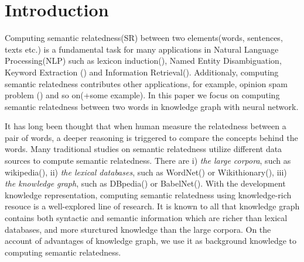\section{Introduction}
Computing semantic relatedness(SR) between two elements(words, sentences,
texts etc.) is a fundamental task for many applications in Natural Language
Processing(NLP) such as lexicon induction(\cite{aaai/QadirMGL15}), Named 
Entity Disambiguation{\cite{acl/HanZ10}}, Keyword Extraction
(\cite{ijcai/ZhangFW13}) and Information Retrieval(\cite{acl/GurevychMZ07}). 
Additionaly, computing semantic relatedness contributes other applications, 
for example, opinion spam problem (\cite{www/SandulescuE15}) and so on(+some example). 
In this paper we focus on computing semantic relatedness between two 
words in knowledge graph with neural network.

It has long been thought that when human measure the relatedness between
a pair of words, a deeper reasoning is triggered to compare the concepts
behind the words. Many traditional studies on semantic relatedness
utilize different data sources to compute semantic relatedness. There are
i) \emph{the large corpora}, such as wikipedia(\cite{ijcai/GabrilovichM07}), 
ii) \emph{the lexical databases}, such as WordNet(\cite{acl/Pucher07}) or Wikithionary(\cite{aaai/ZeschMG08}), 
iii) \emph{the knowledge graph}, such as DBpedia(\cite{aaai/NavigliP12}) or BabelNet(\cite{aaai/NavigliP12}).
With the development knowledge representation, computing semantic relatedness using
knowledge-rich resouce is a well-explored line of research. It is known to all that
knowledge graph contains both syntactic and semantic information which are 
richer than lexical databases, and more sturctured knowledge than the large corpora.
On the account of advantages of knowledge graph, we use it as background 
knowledge to computing semantic relatedness.


